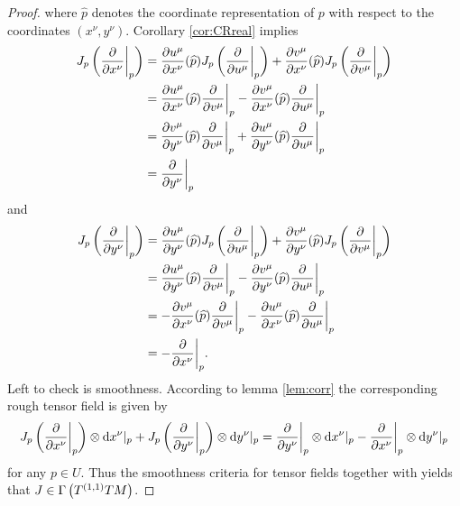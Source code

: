 \begin{proof}
\noindent where $\widehat{p}$ denotes the coordinate representation of $p$ with respect to the coordinates $(x^\nu,y^\nu)$. Corollary \ref{cor:CRreal} implies
\begin{align*}
J_p\del[3]{\frac{\partial}{\partial x^\nu}\bigg\vert_p} &= \frac{\partial u^\mu}{\partial x^\nu}(\widehat{p})J_p\del[3]{\frac{\partial}{\partial u^\mu}\bigg\vert_p} + \frac{\partial v^\mu}{\partial x^\nu}(\widehat{p})J_p\del[3]{\frac{\partial}{\partial v^\mu}\bigg\vert_p}\\
&= \frac{\partial u^\mu}{\partial x^\nu}(\widehat{p})\frac{\partial}{\partial v^\mu}\bigg\vert_p - \frac{\partial v^\mu}{\partial x^\nu}(\widehat{p})\frac{\partial}{\partial u^\mu}\bigg\vert_p\\
&= \frac{\partial v^\mu}{\partial y^\nu}(\widehat{p})\frac{\partial}{\partial v^\mu}\bigg\vert_p + \frac{\partial u^\mu}{\partial y^\nu}(\widehat{p})\frac{\partial}{\partial u^\mu}\bigg\vert_p\\
&= \frac{\partial}{\partial y^\nu}\bigg\vert_p
\end{align*}
\noindent and
\begin{align*}
J_p\del[3]{\frac{\partial}{\partial y^\nu}\bigg\vert_p} &= \frac{\partial u^\mu}{\partial y^\nu}(\widehat{p})J_p\del[3]{\frac{\partial}{\partial u^\mu}\bigg\vert_p} + \frac{\partial v^\mu}{\partial y^\nu}(\widehat{p})J_p\del[3]{\frac{\partial}{\partial v^\mu}\bigg\vert_p}\\
&= \frac{\partial u^\mu}{\partial y^\nu}(\widehat{p})\frac{\partial}{\partial v^\mu}\bigg\vert_p - \frac{\partial v^\mu}{\partial y^\nu}(\widehat{p})\frac{\partial}{\partial u^\mu}\bigg\vert_p\\
&= -\frac{\partial v^\mu}{\partial x^\nu}(\widehat{p})\frac{\partial}{\partial v^\mu}\bigg\vert_p - \frac{\partial u^\mu}{\partial x^\nu}(\widehat{p})\frac{\partial}{\partial u^\mu}\bigg\vert_p\\
&= -\frac{\partial}{\partial x^\nu}\bigg\vert_p.
\end{align*}
Left to check is smoothness. According to lemma \ref{lem:corr} the corresponding rough tensor field is given by
\begin{equation*}
J_p\del[3]{\frac{\partial}{\partial x^\nu}\bigg\vert_p} \otimes \d x^\nu\vert_p + J_p\del[3]{\frac{\partial}{\partial y^\nu}\bigg\vert_p} \otimes \d y^\nu\vert_p = \frac{\partial}{\partial y^\nu}\bigg\vert_p \otimes \d x^\nu\vert_p - \frac{\partial}{\partial x^\nu}\bigg\vert_p \otimes \d y^\nu\vert_p
\end{equation*}
\noindent for any $p \in U$. Thus the smoothness criteria for tensor fields \cite[317--318]{lee:smooth_manifolds:2013} together with \cite[36]{lee:smooth_manifolds:2013} yields that $J \in \Gamma\del[1]{T^{(1,1)}TM}$.
\end{proof}

